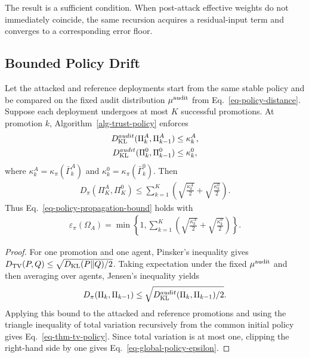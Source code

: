 The result is a sufficient condition. When post-attack effective weights do not immediately coincide, the same recursion acquires a residual-input term and converges to a corresponding error floor.

\subsection{Bounded Policy Drift}
\begin{theorem}
\label{thm-policy-drift}
Let the attacked and reference deployments start from the same stable policy and be compared on the fixed audit distribution $\mu^{\rm audit}$ from Eq.~\ref{eq-policy-distance}. Suppose each deployment undergoes at most $K$ successful promotions. At promotion $k$, Algorithm~\ref{alg-trust-policy} enforces
\begin{align}
D_{\rm KL}^{audit}(\Pi_k^A,\Pi_{k-1}^A)&\le\kappa_k^A,\\
D_{\rm KL}^{audit}(\Pi_k^0,\Pi_{k-1}^0)&\le\kappa_k^0,
\end{align}
where $\kappa_k^A=\kappa_\pi(\bar\Gamma_k^A)$ and $\kappa_k^0=\kappa_\pi(\bar\Gamma_k^0)$. Then
\begin{align}
\label{eq-thm-tv-policy}
D_{\pi}(\Pi_K^A,\Pi_K^0)
\le
\sum_{k=1}^{K}
\left(\sqrt{\frac{\kappa_k^A}{2}}+
\sqrt{\frac{\kappa_k^0}{2}}\right).
\end{align}
Thus Eq.~\ref{eq-policy-propagation-bound} holds with
\begin{align}
\label{eq-global-policy-epsilon}
\varepsilon_\pi(\Omega_A)
=\min\left\{1,
\sum_{k=1}^{K}
\left(\sqrt{\frac{\kappa_k^A}{2}}+
\sqrt{\frac{\kappa_k^0}{2}}\right)
\right\}.
\end{align}
\end{theorem}

\begin{proof}
For one promotion and one agent, Pinsker's inequality gives
$D_{\rm TV}(P,Q)\le\sqrt{D_{\rm KL}(P\|Q)/2}$. Taking expectation under the fixed $\mu^{\rm audit}$ and then averaging over agents, Jensen's inequality yields
\begin{align}
D_{\pi}(\Pi_k,\Pi_{k-1})
\le\sqrt{D_{\rm KL}^{audit}(\Pi_k,\Pi_{k-1})/2}.
\end{align}
Applying this bound to the attacked and reference promotions and using the triangle inequality of total variation recursively from the common initial policy gives Eq.~\ref{eq-thm-tv-policy}. Since total variation is at most one, clipping the right-hand side by one gives Eq.~\ref{eq-global-policy-epsilon}.
\end{proof}

